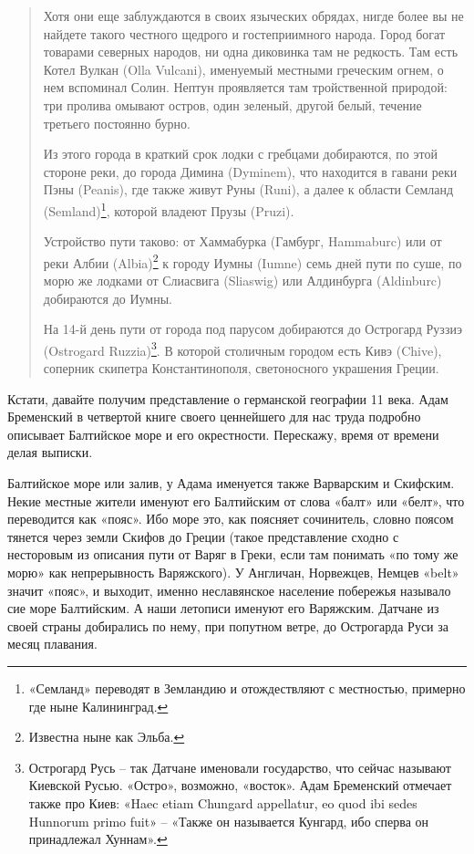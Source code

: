 \begin{quotation}
Хотя они еще заблуждаются в своих языческих обрядах, нигде более вы не найдете такого честного щедрого и гостеприимного народа. Город богат товарами северных народов, ни одна диковинка там не редкость. Там есть Котел Вулкан (Olla Vulcani), именуемый местными греческим огнем, о нем вспоминал Солин. Нептун проявляется там тройственной природой: три пролива омывают остров, один зеленый, другой белый, течение третьего постоянно бурно.

Из этого города в краткий срок лодки с гребцами добираются, по этой стороне реки, до города Димина (Dyminem), что находится в гавани реки Пэны (Peanis), где также живут Руны (Runi), а далее к области Семланд (Semland)\footnote{«Семланд» переводят в Земландию и отождествляют с местностью, примерно где ныне Калининград.}, которой владеют Прузы (Pruzi). 

Устройство пути таково: от Хаммабурка (Гамбург, Hammaburc) или от реки Албии (Albia)\footnote{Известна ныне как Эльба.} к городу Иумны (Iumne) семь дней пути по суше, по морю же лодками от Слиасвига (Sliaswig) или Алдинбурга (Aldinburc) добираются до Иумны.

На 14-й день пути от города под парусом добираются до Острогард Руззиэ (Ostrogard Ruzzia)\footnote{Острогард Русь – так Датчане именовали  государство, что сейчас называют Киевской Русью. «Остро», возможно, «восток». Адам Бременский отмечает также про Киев: «Haec etiam Chungard appellatur, eo quod ibi sedes Hunnorum primo fuit» – «Также он называется Кунгард, ибо сперва он принадлежал Хуннам».}. В которой столичным городом есть Кивэ (Chive), соперник скипетра Константинополя, светоносного украшения Греции.
\end{quotation}

Кстати, давайте получим представление о германской географии 11 века. Адам Бременский в четвертой книге своего ценнейшего для нас труда подробно описывает Балтийское море и его окрестности. Перескажу, время от времени делая выписки.

Балтийское море или залив, у Адама именуется также Варварским и Скифским. Некие местные жители именуют его Балтийским от слова «балт» или «белт», что переводится как «пояс». Ибо море это, как поясняет сочинитель, словно поясом тянется через земли Скифов до Греции (такое представление сходно с несторовым из описания пути от Варяг в Греки, если там понимать «по тому же морю» как непрерывность Варяжского). У Англичан, Норвежцев, Немцев «belt» значит «пояс», и выходит, именно неславянское население побережья называло сие море Балтийским. А наши летописи именуют его Варяжским. Датчане из своей страны добирались по нему, при попутном ветре, до Острогарда Руси за месяц плавания.

